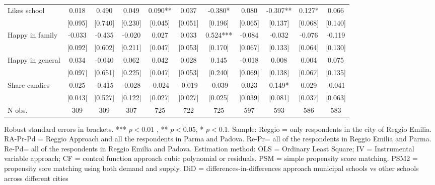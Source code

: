 \documentclass[12pt]{article}
\begin{document}
\begin{table}[ht]
\begin{center}
\begin{adjustbox}{width=1.2\textwidth,center=\textwidth}
\begin{tabular}{l*{10}{c}}
Likes school & 0.018 & 0.490 & 0.049 & 0.090** & 0.037 & -0.380* & 0.080 & -0.307** & 0.127* & 0.066 \\
 & [0.095] & [0.740] & [0.230] & [0.045] & [0.051] & [0.196] & [0.065] & [0.137] & [0.068] & [0.140] \\
Happy in family & -0.033 & -0.435 & -0.020 & 0.027 & 0.033 & 0.524*** & -0.084 & -0.032 & -0.076 & -0.119 \\
 & [0.092] & [0.602] & [0.211] & [0.047] & [0.053] & [0.170] & [0.067] & [0.133] & [0.064] & [0.130] \\
Happy in general & 0.034 & -0.040 & 0.062 & 0.042 & 0.028 & 0.145 & -0.018 & 0.008 & 0.004 & 0.075 \\
 & [0.097] & [0.651] & [0.225] & [0.047] & [0.053] & [0.240] & [0.069] & [0.138] & [0.067] & [0.135] \\
Share candies & 0.025 & -0.415 & -0.028 & -0.024 & -0.019 & -0.039 & 0.023 & 0.149* & 0.029 & -0.041 \\
 & [0.043] & [0.527] & [0.122] & [0.027] & [0.027] & [0.025] & [0.039] & [0.081] & [0.037] & [0.063] \\

\hline
N obs. &  309 & 309 & 307 & 725 & 722 & 725 & 597 & 593 & 586 & 583 \\

\hline
\end{tabular}
\end{adjustbox}
\end{center}
\par
\vspace{1ex}
\par
{\footnotesize \raggedright{Robust standard errors in brackets. *** $p<0.01$%
, ** $p<0.05$, * $p<0.1$. Sample: Reggio = only respondents in the city of
Reggio Emilia. RA-Pr-Pd = Reggio Approach and all the respondents in Parma
and Padova. Re-Pr= all of the respondents in Reggio Emilia and Parma. Re-Pd=
all of the respondents in Reggio Emilia and Padova. Estimation method: OLS =
Ordinary Least Square; IV = Instrumental variable approach; CF = control
function approach cubic polynomial or residuals. PSM = simple propensity
score matching. PSM2 = propensity sore matching using both demand and
supply. DiD = differences-in-differences approach municipal schools vs other
schools across different cities} }
\end{table}
\end{document}
